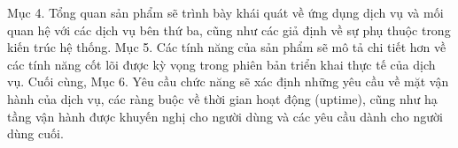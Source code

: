 \quad Mục 4. Tổng quan sản phẩm sẽ trình bày khái quát về ứng dụng dịch vụ và mối quan hệ với các dịch vụ bên thứ ba, cũng như các giả định về sự phụ thuộc trong kiến trúc hệ thống. Mục 5. Các tính năng của sản phẩm sẽ mô tả chi tiết hơn về các tính năng cốt lõi được kỳ vọng trong phiên bản triển khai thực tế của dịch vụ.
Cuối cùng, Mục 6. Yêu cầu chức năng sẽ xác định những yêu cầu về mặt vận hành của dịch vụ, các ràng buộc về thời gian hoạt động (uptime), cũng như hạ tầng vận hành được khuyến nghị cho người dùng và các yêu cầu dành cho người dùng cuối.






\pagebreak